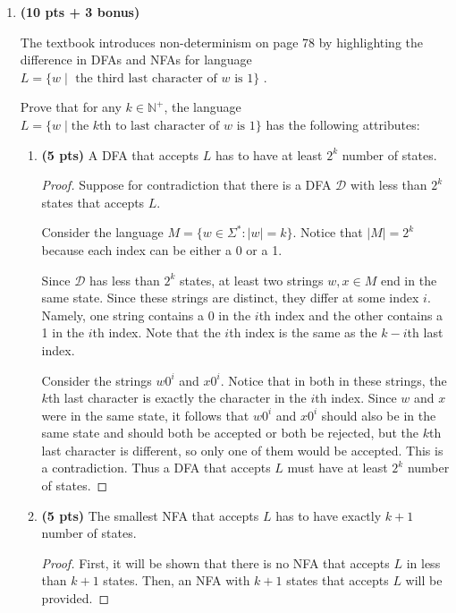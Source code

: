 \documentclass[11pt]{article}
\begin{document}
\begin{enumerate}[label=\textbf{Q\arabic*.}]
\begin{enumerate}[label=\textit{\alph*)}]
\begin{proof}
	\end{proof}

\end{enumerate}


(Continued on the next page)

\newpage

\item \textbf{(10 pts + 3 bonus)}

The textbook introduces non-determinism on page 78 by highlighting the difference in DFAs and NFAs for language $L = \{w \mid \text{ the third last character of } w \text{ is } 1\}$ . 

Prove that for any $k\in \mathbb{N}^+$, the language $L = \{ w \mid \text{the } k\text{th to last character of } w \text{ is } 1\}$ has the following attributes:


\begin{enumerate}[label=\textit{\alph*)}]
\item \textbf{(5 pts)} A DFA that accepts $L$ has to have at least $2^k$ number of states.
\begin{proof}
	Suppose for contradiction that there is a DFA \(\mathcal{D}\) with less than \(2^k\) states that accepts \(L\).

	Consider the language \(M = \{w \in \Sigma ^* : |w| = k\}\). Notice that \(|M| = 2^k\) because each index can be either a 0 or a 1.

	Since \(\mathcal{D}\) has less than \(2^k\) states, at least two strings \(w,x \in M\) end in the same state. Since these strings are distinct, they differ at some index \(i\). Namely, one string contains a 0 in the \(i\)th index and the other contains a 1 in the \(i\)th index. Note that the \(i\)th index is the same as the \(k-i\)th last index.

	Consider the strings \(w0^i\) and \(x0^i\). Notice that in both in these strings, the \(k\)th last character is exactly the character in the \(i\)th index. Since \(w\) and \(x\) were in the same state, it follows that \(w0^i\) and \(x0^i\) should also be in the same state and should both be accepted or both be rejected, but the \(k\)th last character is different, so only one of them would be accepted. This is a contradiction. Thus a DFA that accepts \(L\) must have at least \(2^k\) number of states.
	\smallbreak
\end{proof}

\item \textbf{(5 pts)} The smallest NFA that accepts $L$ has to have exactly $k + 1$ number of states.
\begin{proof}
	First, it will be shown that there is no NFA that accepts \(L\) in less than \(k+1\) states. Then, an NFA with \(k+1\) states that accepts \(L\) will be provided.
	

\end{proof}
\end{enumerate}
\end{enumerate}
\end{document}
